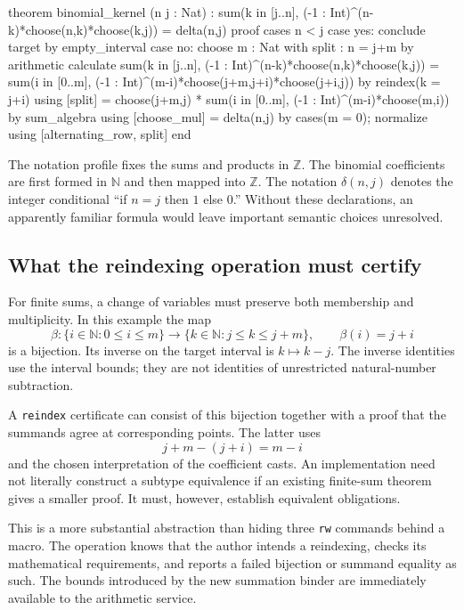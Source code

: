 \documentclass[11pt,a4paper]{article}
\newcommand{\NN}{\mathbb N}
\newcommand{\ZZ}{\mathbb Z}
\newcommand{\codeid}[1]{\nolinkurl{#1}}
\begin{document}
\par\noindent\begin{minipage}{\linewidth}
\begin{rawcode}
theorem binomial_kernel (n j : Nat) :
    sum(k in [j..n], (-1 : Int)^(n-k)*choose(n,k)*choose(k,j))
      = delta(n,j)
proof
  cases n < j
  case yes:
    conclude target by empty_interval
  case no:
    choose m : Nat with split : n = j+m by arithmetic
    calculate
      sum(k in [j..n], (-1 : Int)^(n-k)*choose(n,k)*choose(k,j))
      = sum(i in [0..m],
          (-1 : Int)^(m-i)*choose(j+m,j+i)*choose(j+i,j))
          by reindex(k = j+i) using [split]
      = choose(j+m,j) * sum(i in [0..m], (-1 : Int)^(m-i)*choose(m,i))
          by sum_algebra using [choose_mul]
      = delta(n,j)
          by cases(m = 0); normalize using [alternating_row, split]
end
\end{rawcode}
\end{minipage}\par

The notation profile fixes the sums and products in $\ZZ$. The binomial coefficients are first formed in $\NN$ and then mapped into $\ZZ$. The notation $\delta(n,j)$ denotes the integer conditional ``if $n=j$ then $1$ else $0$.'' Without these declarations, an apparently familiar formula would leave important semantic choices unresolved.

\subsection{What the reindexing operation must certify}

For finite sums, a change of variables must preserve both membership and multiplicity. In this example the map
\[
 \beta:\{i\in\NN:0\le i\le m\}\longrightarrow
       \{k\in\NN:j\le k\le j+m\},\qquad \beta(i)=j+i
\]
is a bijection. Its inverse on the target interval is $k\mapsto k-j$. The inverse identities use the interval bounds; they are not identities of unrestricted natural-number subtraction.

A \codeid{reindex} certificate can consist of this bijection together with a proof that the summands agree at corresponding points. The latter uses
\[
 j+m-(j+i)=m-i
\]
and the chosen interpretation of the coefficient casts. An implementation need not literally construct a subtype equivalence if an existing finite-sum theorem gives a smaller proof. It must, however, establish equivalent obligations.

This is a more substantial abstraction than hiding three \codeid{rw} commands behind a macro. The operation knows that the author intends a reindexing, checks its mathematical requirements, and reports a failed bijection or summand equality as such. The bounds introduced by the new summation binder are immediately available to the arithmetic service.
\end{document}
